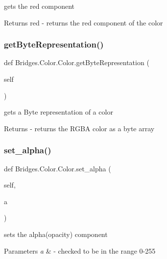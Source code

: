 gets the red component 

\begin{DoxyReturn}{Returns}
red -\/ returns the red component of the color 
\end{DoxyReturn}
\mbox{\label{class_bridges_1_1_color_1_1_color_a13edd205c32eb199664b87f0145f50fe}} 
\subsubsection{\texorpdfstring{get\+Byte\+Representation()}{getByteRepresentation()}}
{\footnotesize\ttfamily def Bridges.\+Color.\+Color.\+get\+Byte\+Representation (\begin{DoxyParamCaption}\item[{}]{self }\end{DoxyParamCaption})}



gets a Byte representation of a color 

\begin{DoxyReturn}{Returns}
-\/ returns the R\+G\+BA color as a byte array 
\end{DoxyReturn}
\mbox{\label{class_bridges_1_1_color_1_1_color_a3dbced3824a73df14c8bf810d445238e}} 
\subsubsection{\texorpdfstring{set\+\_\+alpha()}{set\_alpha()}}
{\footnotesize\ttfamily def Bridges.\+Color.\+Color.\+set\+\_\+alpha (\begin{DoxyParamCaption}\item[{}]{self,  }\item[{}]{a }\end{DoxyParamCaption})}



sets the alpha(opacity) component 


\begin{DoxyParams}{Parameters}
{\em a} & -\/ checked to be in the range 0-\/255 \\
\hline
\end{DoxyParams}
\mbox{\label{class_bridges_1_1_color_1_1_color_a5b298c7b23b82e2599377ec79f199362}} 
